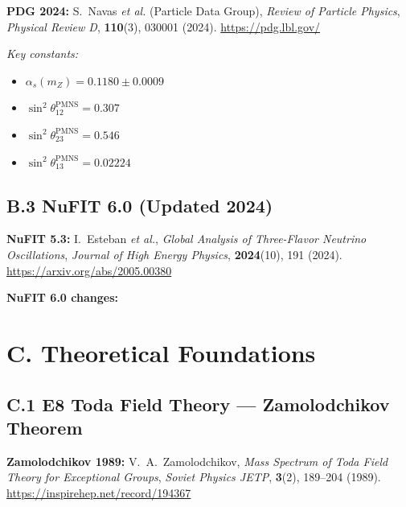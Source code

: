 \documentclass[10pt,a4paper]{article}
\begin{document}
\noindent\textbf{PDG 2024:} S.~Navas \textit{et al.} (Particle Data Group), \textit{Review of Particle Physics}, \textit{Physical Review D}, \textbf{110}(3), 030001 (2024). \url{https://pdg.lbl.gov/}

\textit{Key constants:}
\begin{itemize}
  \item $\alpha_s(m_Z) = 0.1180 \pm 0.0009$
  \item $\sin^2\theta_{12}^{\text{PMNS}} = 0.307$
  \item $\sin^2\theta_{23}^{\text{PMNS}} = 0.546$
  \item $\sin^2\theta_{13}^{\text{PMNS}} = 0.02224$
\end{itemize}

\subsection*{B.3 NuFIT 6.0 (Updated 2024)}

\noindent\textbf{NuFIT 5.3:} I.~Esteban \textit{et al.}, \textit{Global Analysis of Three-Flavor Neutrino Oscillations}, \textit{Journal of High Energy Physics}, \textbf{2024}(10), 191 (2024). \url{https://arxiv.org/abs/2005.00380}

\textbf{NuFIT 6.0 changes:}

\section*{C. Theoretical Foundations}

\subsection*{C.1 E8 Toda Field Theory — Zamolodchikov Theorem}

\noindent\textbf{Zamolodchikov 1989:} V.~A.~Zamolodchikov, \textit{Mass Spectrum of Toda Field Theory for Exceptional Groups}, \textit{Soviet Physics JETP}, \textbf{3}(2), 189--204 (1989). \url{https://inspirehep.net/record/194367}
\end{document}
